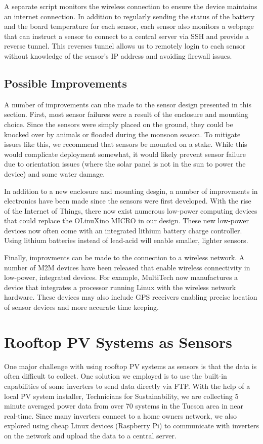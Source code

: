 A separate script monitors the wireless connection to ensure the
device maintains an internet connection.
In addition to regularly sending the status of the battery and the
board temperature for each sensor, each sensor also monitors a webpage
that can instruct a sensor to connect to a central server via SSH and
provide a reverse tunnel.
This reverses tunnel allows us to remotely login to each sensor without
knowledge of the sensor's IP address and avoiding firewall issues.

\subsection{Possible Improvements}
\label{sec:sensor_improvements}
A number of improvements can nbe made to the sensor design presented in
this section.
First, most sensor failures were a result of the enclosure and
mounting choice.
Since the sensors were simply placed on the ground, they could be
knocked over by animals or flooded during the monsoon season.
To mitigate issues like this, we recommend that sensors be mounted on
a stake.
While this would complicate deployment somewhat, it would likely
prevent sensor failure due to orientation issues (where the solar
panel is not in the sun to power the device) and some water damage.

In addition to a new enclosure and mounting desgin, a number of
improvments in electronics have been made since the sensors were first
developed.
With the rise of the Internet of Things, there now exist numerous
low-power computing devices that could replace the OLinuXino MICRO in
our design.
These new low-power devices now often come with an integrated lithium
battery charge controller.
Using lithium batteries instead of lead-acid will enable smaller,
lighter sensors.

Finally, improvments can be made to the connection to a wireless
network.
A number of M2M devices have been released that enable wireless
connectivity in low-power, integrated devices.
For example, MultiTech now manufactures a device that integrates a
processor running Linux with the wireless network hardware.
These devices may also include GPS receivers enabling precise location
of sensor devices and more accurate time keeping.

\section{Rooftop PV Systems as Sensors}
\label{sec:pv_sensors}
One major challenge with using rooftop PV systems as sensors is that
the data is often difficult to collect.
One solution we employed is to use the built-in capabilities of some
inverters to send data directly via FTP.
With the help of a local PV system installer, Technicians for
Sustainability, we are collecting 5 minute averaged power data from
over 70 systems in the Tucson area in near real-time.
Since many inverters connect to a home owners network, we also
explored using cheap Linux devices (Raspberry Pi) to communicate with
inverters on the network and upload the data to a central server.

